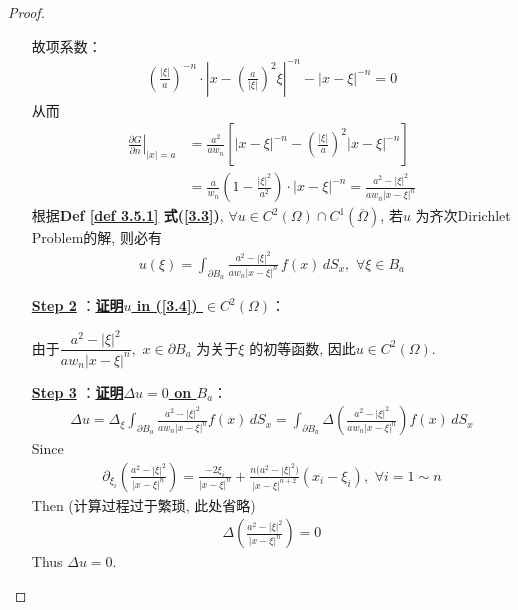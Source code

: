 \begin{thm}
\begin{proof}
\begin{enumerate}
				故项系数：
				\begin{align*}
					\left( \frac{| \xi |}{a} \right)^{-n} \cdot \left| x - \left( \frac{a}{| \xi |} \right)^2 \xi \right|^{-n} - | x - \xi |^{-n} 
					= 0
				\end{align*}
				从而
				\begin{align*}
					\left. \frac{\partial G}{\partial n} \right|_{| x | = a} 
					&= \frac{a^2}{a w_n} \left[ | x - \xi |^{-n} - \left( \frac{| \xi |}{a} \right)^2 | x - \xi |^{-n} \right] \\
					&= \frac{a}{w_n} \left( 1 - \frac{| \xi |^2}{a^2} \right) \cdot | x - \xi |^{-n} 
					= \frac{a^2 - | \xi |^2}{a w_n | x - \xi |^n}
				\end{align*}
				根据\textbf{Def \ref{def 3.5.1} 式(\ref{3.3})}, $\forall u \in C^2(\Omega) \cap C^1 \left(	\overline{\Omega} \right)$, 若$u$ 为齐次Dirichlet Problem的解, 则必有
				\begin{align*}
					u(\xi) 
					= \int_{\partial B_a} \frac{a^2 - | \xi |^2}{a w_n | x - \xi |^n} \, f(x) \, dS_x , \,\, \forall \xi \in B_a
				\end{align*}
			
				\newpage
				
				\item[\underline{\textbf{Step 2}}]：\underline{\textbf{证明$u$ in (\ref{3.4}) $\in C^2(\Omega)$}}：
				
				\vspace*{1em}
				
				由于$\dfrac{a^2 - | \xi |^2}{a w_n | x - \xi |^n}, \,\, x \in \partial B_a$ 为关于$\xi$ 的初等函数, 因此$u \in C^2(\Omega)$. 
				
				\vspace*{4em}
				
				\item[\underline{\textbf{Step 3}}]：\underline{\textbf{证明$\Delta u = 0$ on $B_a$}}：
				\begin{align*}
					\Delta u 
					= \Delta_\xi \int_{\partial B_a} \frac{a^2 - | \xi |^2}{a w_n | x - \xi |^n} f(x) \, dS_x 
					= \int_{\partial B_a} \Delta \left( \frac{a^2 - | \xi |^2}{a w_n | x - \xi |^n} \right) f(x) \, dS_x
				\end{align*}
				Since 
				\begin{align*}
					\partial_{\xi_i} \left( \frac{a^2 - | \xi |^2}{| x - \xi |^n} \right)
					= \frac{-2\xi_i}{| x - \xi |^n} + \frac{n \Big( a^2 - | \xi |^2 \Big)}{| x - \xi |^{n + 2}} (x_i - \xi_i) , \,\, \forall i = 1 \sim n
				\end{align*}
				Then (计算过程过于繁琐, 此处省略)
				\begin{align*}
					\Delta \left( \frac{a^2 - | \xi |^2}{| x - \xi |^n} \right) 
					= 0
				\end{align*}
				Thus $\Delta u = 0$. 
				

\end{enumerate}
\end{proof}
\end{thm}
